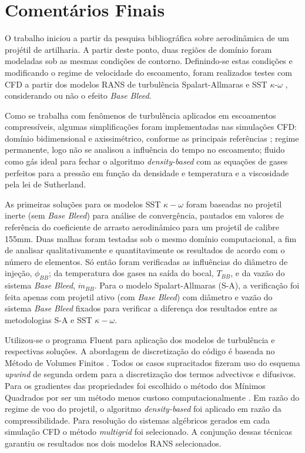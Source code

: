 \chapter{Comentários Finais}\label{cap:conclusoes}

O trabalho iniciou a partir da pesquisa bibliográfica sobre aerodinâmica de um projétil de artilharia. A partir deste ponto, duas regiões de domínio foram modeladas sob as mesmas condições de contorno. Definindo-se estas condições e modificando o regime de velocidade do escoamento, foram realizados testes com CFD a partir dos modelos RANS de turbulência Spalart-Allmaras \cite{Spalart1992} e SST $\kappa$-$\omega$ \cite{Menter1994TwoequationET,Menter2003,Menter2009}, considerando ou não o efeito \textit{Base Bleed}.

Como se trabalha com fenômenos de turbulência aplicados em escoamentos compressíveis, algumas simplificações foram implementadas nas simulações CFD: domínio bidimensional e axissimétrico, conforme as principais referências \cite{Mahmoud2009,Lucena2020}; regime permanente, logo não se analisou a influência do tempo no escoamento; fluido como gás ideal para fechar o algoritmo \textit{density-based} com as equações de gases perfeitos para a pressão em função da densidade e temperatura e a viscosidade pela lei de Sutherland.

As primeiras soluções para os modelos SST $\kappa-\omega$ foram baseadas no projetil inerte (sem \textit{Base Bleed}) para análise de convergência, pautados em valores de referência \cite{Mahmoud2009} do coeficiente de arrasto aerodinâmico para um projetil de calibre 155mm. Duas malhas foram testadas sob o mesmo domínio computacional, a fim de analisar qualitativamente e quantitavimente os resultados de acordo com o número de elementos. Só então foram verificadas as influências do diâmetro de injeção, \(\phi_{BB}\); da temperatura dos gases na saída do bocal, \(T_{BB}\), e da vazão do sistema \textit{Base Bleed}, \(\Dot{m}_{BB}\). Para o modelo Spalart-Allmaras (S-A), a verificação foi feita apenas com projetil ativo (com \textit{Base Bleed}) com diâmetro e vazão do sistema \textit{Base Bleed} fixados para verificar a diferença dos resultados entre as metodologias S-A e SST $\kappa-\omega$.

Utilizou-se o programa Fluent \cite{fluent2021ansys} para aplicação dos modelos de turbulência e respectivas soluções. A abordagem de discretização do código é baseada no Método de Volumes Finitos \cite{McDonald1971,MacComarck&Paulay1972}. Todos os casos supracitados fizeram uso do esquema \textit{upwind} de segunda ordem para a discretização dos termos advectivos e difusivos. Para os gradientes das propriedades foi escolhido o método dos Mínimos Quadrados por ser um método menos custoso computacionalmente \cite{fluent2021ansys}. Em razão do regime de voo do projetil, o algoritmo \textit{density-based} \cite{Weiss1995PreconditioningAT,Weiss1997IMPLICITSO,Weiss1999ImplicitSO} foi aplicado em razão da compressibilidade. Para resolução do sistemas algébricos gerados em cada simulação CFD o método \textit{multigrid} \cite{Hutchinson1986} foi selecionado. A conjunção dessas técnicas garantiu os resultados nos dois modelos RANS selecionados.

